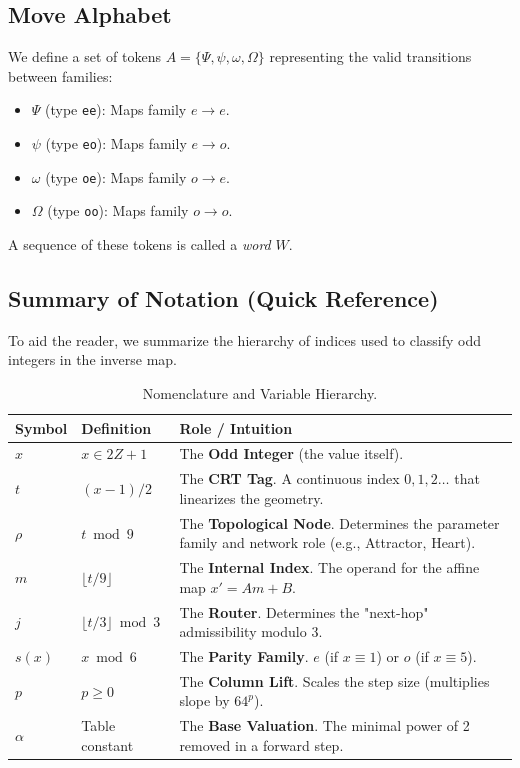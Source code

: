 \documentclass[11pt,letterpaper]{amsart}
\def\mathrm#1{#1}%
\def\mathcal#1{#1}%
\def\mathbb#1{#1}%
\theoremstyle{definition}
\theoremstyle{plain}
\theoremstyle{plain}
\theoremstyle{remark}
\begin{document}
\subsection{Move Alphabet}
We define a set of tokens $\mathcal{A} = \{\Psi, \psi, \omega, \Omega\}$ representing the valid transitions between families:
\begin{itemize}
    \item $\Psi$ (type \texttt{ee}): Maps family $\mathrm{e} \to \mathrm{e}$.
    \item $\psi$ (type \texttt{eo}): Maps family $\mathrm{e} \to \mathrm{o}$.
    \item $\omega$ (type \texttt{oe}): Maps family $\mathrm{o} \to \mathrm{e}$.
    \item $\Omega$ (type \texttt{oo}): Maps family $\mathrm{o} \to \mathrm{o}$.
\end{itemize}
A sequence of these tokens is called a \emph{word} $W$.

\subsection{Summary of Notation (Quick Reference)}
To aid the reader, we summarize the hierarchy of indices used to classify odd integers in the inverse map.

\begin{table}[H]
\centering
\caption{Nomenclature and Variable Hierarchy.}
\label{tab:nomenclature}
\renewcommand{\arraystretch}{1.3}
\begin{tabularx}{\linewidth}{@{}l l X@{}}
\toprule
\textbf{Symbol} & \textbf{Definition} & \textbf{Role / Intuition} \\
\midrule
$x$ & $x \in 2\mathbb{Z}+1$ & The \textbf{Odd Integer} (the value itself). \\
$t$ & $(x-1)/2$ & The \textbf{CRT Tag}. A continuous index $0,1,2\dots$ that linearizes the geometry. \\
$\rho$ & $t \bmod 9$ & The \textbf{Topological Node}. Determines the parameter family and network role (e.g., Attractor, Heart). \\
$m$ & $\lfloor t/9 \rfloor$ & The \textbf{Internal Index}. The operand for the affine map $x' = A m + B$. \\
$j$ & $\lfloor t/3 \rfloor \bmod 3$ & The \textbf{Router}. Determines the "next-hop" admissibility modulo 3. \\
$s(x)$ & $x \bmod 6$ & The \textbf{Parity Family}. $\mathrm{e}$ (if $x \equiv 1$) or $\mathrm{o}$ (if $x \equiv 5$). \\
$p$ & $p \ge 0$ & The \textbf{Column Lift}. Scales the step size (multiplies slope by $64^p$). \\
$\alpha$ & Table constant & The \textbf{Base Valuation}. The minimal power of 2 removed in a forward step. \\
\bottomrule
\end{tabularx}
\end{table}
\end{document}
